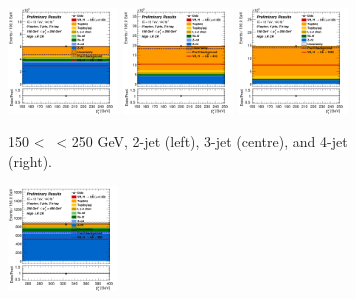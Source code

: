 \begin{figure}[h!]
    \centering
    \begin{subfigure}[b]{\textwidth}
        \centering
        \includegraphics[width=0.32\textwidth]{Images/VH/Own_fit/postfit_VHbb/Region_distpTV_BMax250_BMin150_DCRHigh_J2_TTypebb_T2_L0_Y6051_GlobalFit_conditionnal_mu1.png}
        \includegraphics[width=0.32\textwidth]{Images/VH/Own_fit/postfit_VHbb/Region_distpTV_BMax250_BMin150_DCRHigh_J3_TTypebb_T2_L0_Y6051_GlobalFit_conditionnal_mu1.png}
        \includegraphics[width=0.32\textwidth]{Images/VH/Own_fit/postfit_VHbb/Region_distpTV_BMax250_BMin150_DCRHigh_J4_TTypebb_T2_L0_Y6051_GlobalFit_conditionnal_mu1.png}
        \caption{150 < \ptv\ < 250 GeV, 2-jet (left), 3-jet (centre), and 4-jet (right).}
        \label{fig:plots_VHbb_OL_150_CRH}
    \end{subfigure}
    \begin{subfigure}[b]{\textwidth}
        \centering
        \includegraphics[width=0.32\textwidth]{Images/VH/Own_fit/postfit_VHbb/Region_distpTV_BMax400_BMin250_DCRHigh_J2_TTypebb_T2_L0_Y6051_GlobalFit_conditionnal_mu1.png}

\end{subfigure}
\end{figure}

